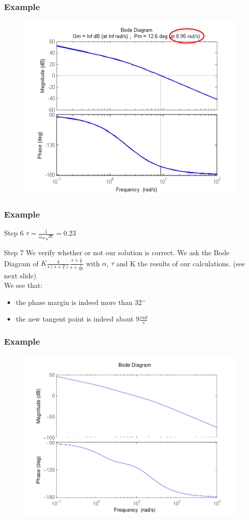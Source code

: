\begin{frame}
	\frametitle{Example}
	\begin{figure}
		\centering
		\includegraphics[width=0.7
		\linewidth]{exampleleadstep6}
	\end{figure}
\end{frame}

\begin{frame}
	\frametitle{Example}
	\begin{block}{Step 6}
		$\tau = \frac{1}{\omega_m\sqrt{\alpha}} = 0.23$
	\end{block}
	\begin{block}{Step 7}
	We verify whether or not our solution is correct. We ask the Bode Diagram of $K \frac{4}{s(s+2)} \frac{s+\frac{1}{\tau}}{s+\frac{1}{\alpha\tau}}$ with $\alpha$, $\tau$ and K the results of our calculations. (see next slide) \\
	We see that: 
	\begin{itemize}
		\item the phase margin is indeed more than $32\,^{\circ}$ 
		\item the new tangent point is indeed about $9\frac{rad}{s}$
	\end{itemize} 
	\end{block}
\end{frame}

\begin{frame}
\frametitle{Example}
\begin{figure}
	\centering
	\includegraphics[width=0.7
	\linewidth]{bodesolutionexamplelead}
\end{figure}
\end{frame}

